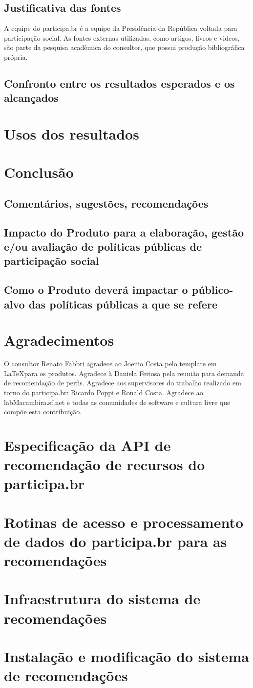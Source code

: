 \documentclass[12pt]{article}
\begin{document}
\subsection{Justificativa das fontes}
A equipe do participa.br é a equipe da Presidência da República voltada para participação social. As fontes externas utilizadas, como artigos, livros e videos, são parte da pesquisa acadêmica do consultor, que possui produção bibliográfica própria.

\subsection{Confronto entre os resultados esperados e os alcançados}
\section{Usos dos resultados}\label{sec:uso}
\section{Conclusão}
\subsection{Comentários, sugestões, recomendações}
\subsection{Impacto do Produto para a elaboração, gestão e/ou avaliação de políticas públicas de participação social}
\subsection{Como o Produto deverá impactar o público-alvo das políticas públicas a que se refere}
\section{Agradecimentos}
O consultor Renato Fabbri agradece ao Joenio Costa pelo template em \LaTeX para os produtos. Agradece à Daniela Feitosa pela reunião para demanda de recomendação de perfis. Agradece aos supervisores do trabalho realizado em torno do participa.br: Ricardo Poppi e Ronald Costa. Agradece ao labMacambira.sf.net e todas as comunidades de software e cultura livre que compõe esta contribuição.
\newpage

\newpage

\newpage
\printindex
\newpage
%
\appendix
\section{Especificação da API de recomendação de recursos do participa.br}\label{sec:api}
\section{Rotinas de acesso e processamento de dados do participa.br para as recomendações}\label{sec:algs}
\section{Infraestrutura do sistema de recomendações}
\section{Instalação e modificação do sistema de recomendações}
\end{document}
